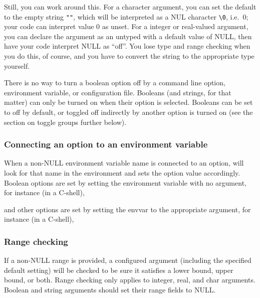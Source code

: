 Still, you can work around this. For a character argument, you can set
the default to the empty string \verb+""+, which will be interpreted
as a NUL character \verb+\0+, i.e.\ 0; your code can interpret value 0
as unset. For a integer or real-valued argument, you can declare the
argument as an untyped  with a default value of
NULL, then have your code interpret NULL as ``off''.  You lose type
and range checking when you do this, of course, and you have to
convert the string to the appropriate type yourself.
   
There is no way to turn a boolean option off by a command line option,
environment variable, or configuration file. Booleans (and strings,
for that matter) can only be turned on when their option is
selected. Booleans can be set to off by default, or toggled off
indirectly by another option is turned on (see the section on toggle
groups further below).

   \subsubsection{Connecting an option to an environment variable}

When a non-NULL environment variable name is connected to an option,
 will look for that name in the
environment and sets the option value accordingly. Boolean options are
set by setting the environment variable with no argument, for instance
(in a C-shell),

\begin{cchunk}
\end{cchunk}

and other options are set by setting the envvar to the appropriate
argument, for instance (in a C-shell),

\begin{cchunk}
\end{cchunk}

   \subsubsection{Range checking}

If a non-NULL range is provided, a configured argument (including the
specified default setting) will be checked to be sure it satisfies a
lower bound, upper bound, or both. Range checking only applies to
integer, real, and char arguments. Boolean and string arguments should
set their range fields to NULL.

